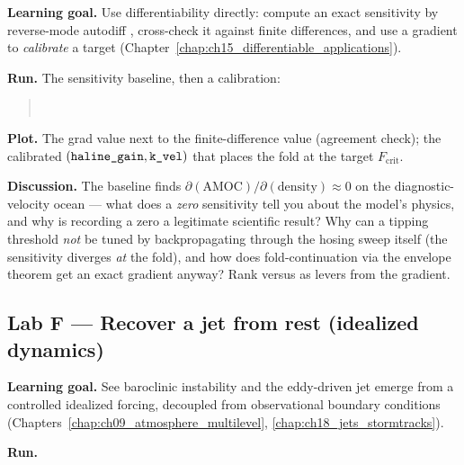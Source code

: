 \textbf{Learning goal.} Use differentiability directly: compute an exact sensitivity by
reverse-mode autodiff \citep{jax2018}, cross-check it against finite differences, and use a
gradient to \emph{calibrate} a target (Chapter~\ref{chap:ch15_differentiable_applications}).

\textbf{Run.} The sensitivity baseline, then a calibration:
\begin{quote}\small
{}\\
\end{quote}

\textbf{Plot.} The grad value next to the finite-difference value (agreement check); the
calibrated $(\texttt{haline\_gain},\texttt{k\_vel})$ that places the fold at the target $F_{\mathrm{crit}}$.

\textbf{Discussion.} The baseline finds $\partial(\text{AMOC})/\partial(\text{density})\approx0$
on the diagnostic-velocity ocean --- what does a \emph{zero} sensitivity tell you about the
model's physics, and why is recording a zero a legitimate scientific result? Why can a tipping
threshold \emph{not} be tuned by backpropagating through the hosing sweep itself (the sensitivity
diverges \emph{at} the fold), and how does fold-continuation via the envelope theorem get an exact
gradient anyway? Rank  versus  as levers from the gradient.

\subsection{Lab F --- Recover a jet from rest (idealized dynamics)}

\textbf{Learning goal.} See baroclinic instability and the eddy-driven jet emerge from a
controlled idealized forcing, decoupled from observational boundary conditions
\citep{heldsuarez1994} (Chapters~\ref{chap:ch09_atmosphere_multilevel},
\ref{chap:ch18_jets_stormtracks}).

\textbf{Run.}
\begin{quote}\small
{}
\end{quote}

